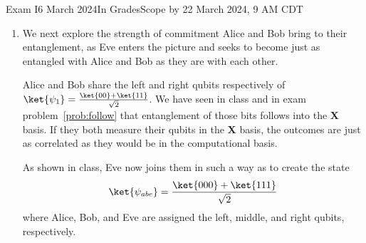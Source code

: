 \documentclass[12pt]{article}
\newcommand{\Blank}[1][1in]{\mbox{\vrule width #1 depth 2pt}\vrule width 0pt height 2.0em}
\def\Bell{%
\BellTwo{00}{11}}
\def\BellTwo#1#2{%
\BellTwoSign{#1}{#2}{+}}
\def\BellTwoSign#1#2#3{%
\ensuremath{\frac{\ket{#1} #3 \ket{#2}}{\sqrt{2}}}}
\def\BellM{\BellTwoSign{01}{10}{-}}
\begin{document}
\begin{assignment}{Exam I}{6 March 2024}{In GradesScope by 22 March 2024, 9 AM CDT}
\begin{enumerate}
Here is a useful fact (mention this in passing at your next party):  
\[ \mbox{If $U$ is unitary then }\left|\mbox{det}(U)\right| =  1 \]

That is, the determinant of a unitary matrix has magnitude~$1$.

Equipped, aware, and fascinated by that useful fact, prove that
\[ \ket{\psi_{2}} \equiv \BellM{}\]
In other words, Alice and Bob can apply $U$ to this other Bell state  and they still have (up to a global phase) state .  

Your proof below:
\LeaveSpace{2in}
If Alice and Bob begin in state , does that entanglement follow them after any $U$ is applied to each qubit, so that their measurements consistently disagree?\Blank{}
\clearpage\item{}
We next explore the strength of commitment Alice and Bob bring to their
entanglement, as Eve enters the picture and seeks to become just as entangled
with Alice and Bob as they are with each other.

Alice and Bob share the left and right qubits respectively of $\ket{\psi_{1}}=\Bell{}$.
We have seen in class and in exam problem~\ref{prob:follow} that entanglement of those bits follows into the 
\textbf{X} basis.  If they both measure their qubits in the \textbf{X} basis,
the outcomes are just as correlated as they would be in the computational
basis.

As shown in class, Eve now joins them in such a way as to create the state
\[
\ket{\psi_{abe}} = \BellTwo{000}{111}
\]
where Alice, Bob, and Eve are assigned the left, middle, and right qubits,
respectively.


\end{enumerate}
\end{assignment}
\end{document}
